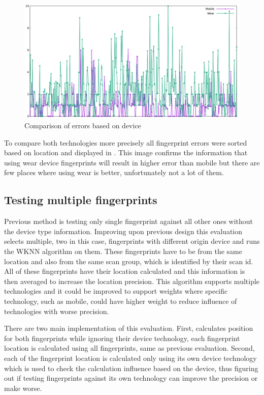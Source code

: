 \begin{figure}[h!]
	\begin{centering}
		\includegraphics[width=1\textwidth]{img/wknn_errors_mobile_phone}
		\par\end{centering}
	\caption{Comparison of errors based on device}
	\label{fig06c06}
\end{figure}

To compare both technologies more precisely all fingerprint errors were sorted based on location and displayed in . This image confirms the information that using wear device fingerprints will result in higher error than mobile but there are few places where using wear is better, unfortunately not a lot of them. 

\subsection{Testing multiple fingerprints}\label{sec:TestingMultipleFingerprint}
Previous method is testing only single fingerprint against all other ones without the device type information. Improving upon previous design this evaluation selects multiple, two in this case, fingerprints with different origin device and runs the WKNN algorithm on them. These fingerprints have to be from the same location and also from the same scan group, which is identified by their scan id. All of these fingerprints have their location calculated and this information is then averaged to increase the location precision. This algorithm supports multiple technologies and it could be improved to support weights where specific technology, such as mobile, could have higher weight to reduce influence of technologies with worse precision.

There are two main implementation of this evaluation. First, calculates position for both fingerprints while ignoring  their device technology, each fingerprint location is calculated using all fingerprints, same as previous evaluation. Second, each of the fingerprint location is calculated only using its own device technology which is used to check the calculation influence based on the device, thus figuring out if testing fingerprints against its own technology can improve the precision or make worse.

